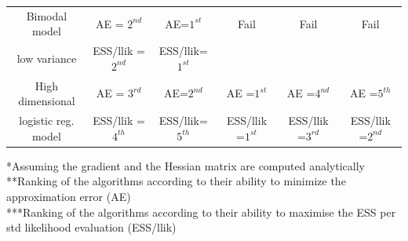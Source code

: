 \documentclass[11pt,a4paper]{report}\usepackage[]{graphicx}\usepackage[]{color}
\begin{document}
{\begin{landscape}
\begin{tabular}{c|ccccc}
        \hline
        Bimodal model & AE = $2^{nd}$ & AE=$1^{st}$&Fail&Fail&Fail\\
        low variance &ESS/llik = $2^{nd}$ & ESS/llik=$1^{st}$&&&\\
        \hline
         High dimensional& AE = $3^{rd}$ & AE=$2^{nd}$&AE =$1^{st}$&AE =$4^{nd}$&AE =$5^{th}$\\
        logistic reg. model&ESS/llik = $4^{th}$ & ESS/llik=$5^{th}$&ESS/llik =$1^{st}$&ESS/llik =$3^{rd}$&ESS/llik =$2^{nd}$\\
        \hline
    \end{tabular}
        \small{*Assuming the gradient and the Hessian matrix are computed analytically\\}
        \small{**Ranking of the algorithms according to their ability to minimize the approximation error (AE)\\}
        \small{***Ranking of the algorithms according to their ability to maximise the ESS per std likelihood evaluation (ESS/llik)\\}
    \end{landscape}
    \clearpage%
}
\restoregeometry
 


\end{document}
